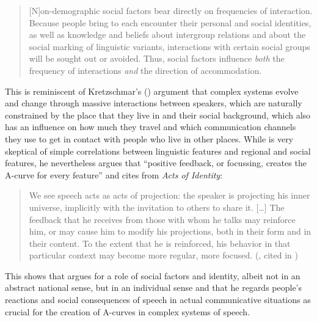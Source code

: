 \begin{quote}
[N]on-demographic social factors bear directly on frequencies of interaction. Because people bring to each encounter their personal and social identities, as well as knowledge and beliefs about intergroup relations and about the social marking of linguistic variants, interactions with certain social groups will be sought out or avoided. Thus, social factors influence \textit{both} the frequency of interactions \textit{and} the direction of accommodation.
\end{quote}

This is reminiscent of Kretzschmar’s (\citeyear{Kretzschmar2014, Kretzschmar2015}) argument that complex systems evolve and change through massive interactions between speakers, which are naturally constrained by the place that they live in and their social background, which also has an influence on how much they travel and which communication channels they use to get in contact with people who live in other places. While \citet[262]{Kretzschmar2015} is very skeptical of simple correlations between linguistic features and regional and social features, he nevertheless argues that “positive feedback, or focussing, creates the A-curve for every feature” \citep[152]{Kretzschmar2014} and cites from  \emph{Acts of Identity}:

\begin{quote}
We see speech acts as acts of projection: the speaker is projecting his inner universe, implicitly with the invitation to others to share it. […] The feedback that he receives from those with whom he talks may reinforce him, or may cause him to modify his projections, both in their form and in their content. To the extent that he is reinforced, his behavior in that particular context may become more regular, more focused. (\citealt[181--192]{LePage1985}, cited in \citealt[152]{Kretzschmar2014})
\end{quote}

This shows that \citet{Kretzschmar2014, Kretzschmar2015} argues for a role of social factors and identity, albeit not in an abstract national sense, but in an individual sense and that he regards people’s reactions and social consequences of speech in actual communicative situations as crucial for the creation of A-curves in complex systems of speech.

